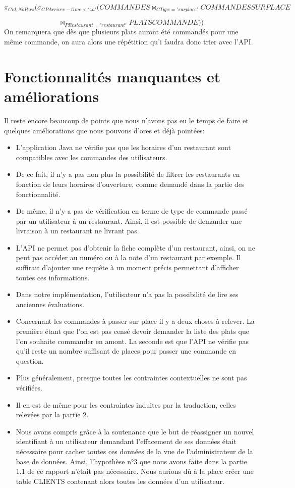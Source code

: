 \documentclass[10pt, a4paper]{article}
\begin{document}
$$
    \pi_{Cid, NbPers}(\sigma_{CPArrivee - time < '4h'}(COMMANDES \Join_{CType = 'sur place'} COMMANDESSURPLACE
    $$

    $$
    \Join_{PRestaurant = 'restaurant'} PLATSCOMMANDE))
$$
On remarquera que dès que plusieurs plats auront été commandés pour une même commande, on aura alors
une répétition qu'i faudra donc trier avec l'API.

\section{Fonctionnalités manquantes et améliorations}

Il reste encore beaucoup de points que nous n'avons pas eu le temps de faire et quelques améliorations que nous pouvons d'ores et déjà pointées:

\begin{itemize}
    \item L'application Java ne vérifie pas que les horaires d'un restaurant sont compatibles avec les commandes des utilisateurs.
    \item De ce fait, il n'y a pas non plus la possibilité de filtrer les restaurants en fonction de leurs horaires d'ouverture, comme demandé dans la partie des fonctionnalité.
    \item De même, il n'y a pas de vérification en terme de type de commande passé par un utilisateur à un restaurant. Ainsi, il est possible de demander une livraison à un restaurant ne livrant pas.
    \item L'API ne permet pas d'obtenir la fiche complète d'un restaurant, ainsi, on ne peut pas accéder au numéro ou à la note d'un restaurant par exemple. Il suffirait d'ajouter une requête à un moment précis permettant d'afficher toutes ces informations.
    \item Dans notre implémentation, l'utilisateur n'a pas la possibilité de lire ses anciennes évaluations.
    \item Concernant les commandes à passer sur place il y a deux choses à relever. La première étant que l'on est pas censé devoir demander la liste des plats que l'on souhaite commander en amont. La seconde est que l'API ne vérifie pas qu'il reste un nombre suffisant de places pour passer une commande en question.
    \item Plus généralement, presque toutes les contraintes contextuelles ne sont pas vérifiées.
    \item Il en est de même pour les contraintes induites par la traduction, celles relevées par la partie 2.
    \item Nous avons compris grâce à la soutenance que le but de réassigner un nouvel identifiant à un utilisateur demandant l'effacement de ses données était nécessaire pour cacher toutes ces données de la vue de l'administrateur de la base de données. Ainsi, l'hypothèse n°3 que nous avons faite dans la partie 1.1 de ce rapport n'était pas nécessaire. Nous aurions dû à la place créer une table CLIENTS contenant alors toutes les données d'un utilisateur.
\end{itemize}
\end{document}
